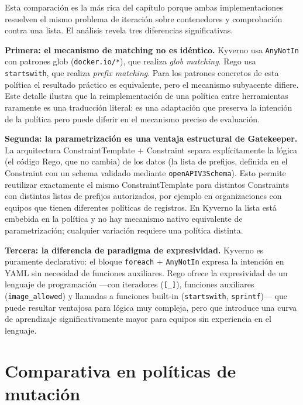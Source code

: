 Esta comparación es la más rica del capítulo porque ambas implementaciones resuelven el mismo problema de iteración sobre contenedores y comprobación contra una lista. El análisis revela tres diferencias significativas.

\textbf{Primera: el mecanismo de matching no es idéntico.} Kyverno usa \texttt{AnyNotIn} con patrones glob (\texttt{docker.io/*}), que realiza \textit{glob matching}. Rego usa \texttt{startswith}, que realiza \textit{prefix matching}. Para los patrones concretos de esta política el resultado práctico es equivalente, pero el mecanismo subyacente difiere. Este detalle ilustra que la reimplementación de una política entre herramientas raramente es una traducción literal: es una adaptación que preserva la intención de la política pero puede diferir en el mecanismo preciso de evaluación.

\textbf{Segunda: la parametrización es una ventaja estructural de Gatekeeper.} La arquitectura ConstraintTemplate + Constraint separa explícitamente la lógica (el código Rego, que no cambia) de los datos (la lista de prefijos, definida en el Constraint con un schema validado mediante \texttt{openAPIV3Schema}). Esto permite reutilizar exactamente el mismo ConstraintTemplate para distintos Constraints con distintas listas de prefijos autorizados, por ejemplo en organizaciones con equipos que tienen diferentes políticas de registros. En Kyverno la lista está embebida en la política y no hay mecanismo nativo equivalente de parametrización; cualquier variación requiere una política distinta.

\textbf{Tercera: la diferencia de paradigma de expresividad.} Kyverno es puramente declarativo: el bloque \texttt{foreach} + \texttt{AnyNotIn} expresa la intención en YAML sin necesidad de funciones auxiliares. Rego ofrece la expresividad de un lenguaje de programación ---con iteradores (\texttt{[\_]}), funciones auxiliares (\texttt{image\_allowed}) y llamadas a funciones built-in (\texttt{startswith}, \texttt{sprintf})--- que puede resultar ventajosa para lógica muy compleja, pero que introduce una curva de aprendizaje significativamente mayor para equipos sin experiencia en el lenguaje.

\section{Comparativa en políticas de mutación}

